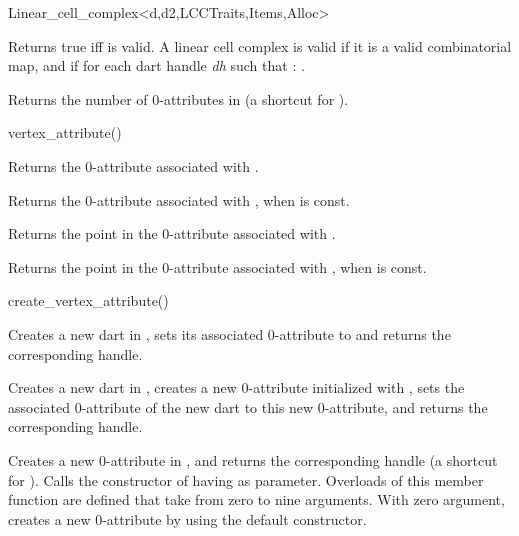 \begin{ccRefClass}{Linear_cell_complex<d,d2,LCCTraits,Items,Alloc>}

         {Returns true iff  is valid.}
A linear cell complex  is valid  
if it is a valid combinatorial map, and if for each dart handle \emph{dh} such that 
\myin{}: .


{Returns the number of 0-attributes in 
       (a shortcut for ).}
 
{vertex_attribute()}{}

{Returns the 0-attribute associated with .}

{Returns the 0-attribute associated with , when  is const.}

{Returns the point in the 0-attribute associated with .}

{Returns the point in the 0-attribute associated with , 
 when  is const.}

{create_vertex_attribute()}{}

   {Creates a new dart in , sets its associated 0-attribute
     to  and returns the corresponding handle.
   }

{Creates a new dart in , creates a new 0-attribute 
  initialized with , sets the associated 0-attribute
  of the new dart to this new 0-attribute, 
  and returns the corresponding handle.}

 {Creates a new 0-attribute in
  , and returns the corresponding handle (a shortcut for
  ).  Calls the constructor of
   having  as parameter.  Overloads of
  this member function are defined that take from zero to nine
  arguments.  With zero argument, 
  creates a new 0-attribute by using the default constructor.}


\end{ccRefClass}
